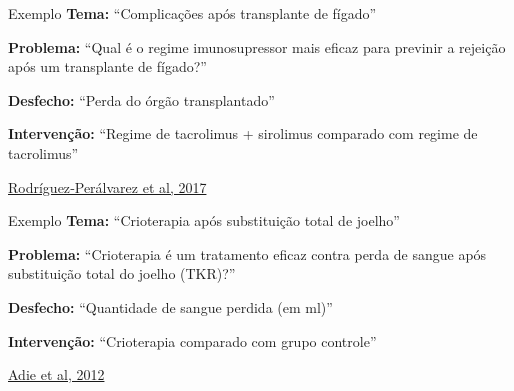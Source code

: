 \documentclass{beamer}
\begin{document}
\begin{frame}
  \begin{exampleblock}{Exemplo}
    \tiny
    {\bf Tema: }``Complicações após transplante de fígado''

    \bigskip
    {\bf Problema:} ``Qual é o regime imunosupressor mais eficaz para previnir a rejeição após um transplante de fígado?''

    \bigskip
    {\bf Desfecho:} ``Perda do órgão transplantado''

    \bigskip
    \normalsize
    {\bf Intervenção:} ``Regime de tacrolimus + sirolimus comparado com regime de tacrolimus''
  \end{exampleblock}

  \vfill
  \scriptsize
  \hfill \href{https://doi.org/10.1002/14651858.cd011639.pub2}{Rodríguez‐Perálvarez et al, 2017}
\end{frame}

\begin{frame}
  \begin{exampleblock}{Exemplo}
    \tiny
    {\bf Tema: }``Crioterapia após substituição total de joelho''

    \bigskip
    {\bf Problema:} ``Crioterapia é um tratamento eficaz contra perda de sangue após substituição total do joelho (TKR)?''

    \bigskip
    {\bf Desfecho:} ``Quantidade de sangue perdida (em ml)''

    \bigskip
    \normalsize
    {\bf Intervenção:} ``Crioterapia comparado com grupo controle''
\end{exampleblock}

  \vfill
  \scriptsize
  \hfill \href{https://doi.org/10.1002/14651858.CD007911.pub2}{Adie et al, 2012}
\end{frame}
\end{document}
